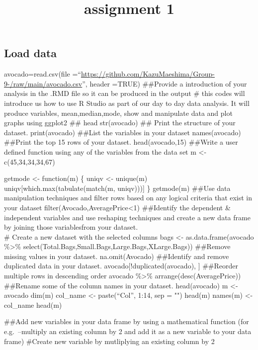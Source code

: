 \documentclass[
]{article}
\title{assignment 1}
\author{}
\date{\vspace{-2.5em}}
\begin{document}
\maketitle

\hypertarget{load-data}{%
\subsection{Load data}\label{load-data}}

avocado=read.csv(file
=``\url{https://github.com/KazuMaeshima/Group-9-/raw/main/avocado.csv}'',
header =TRUE) \#\#Provide a introduction of your analysis in the .RMD
file so it can be produced in the output \# this codes will introduce us
how to use R Studio as part of our day to day data analysis. It will
produce variables, mean,median,mode, show and manipulate data and plot
graphs using ggplot2 \#\# head str(avocado) \#\# Print the structure of
your dataset. print(avocado) \#\#List the variables in your dataset
names(avocado) \#\#Print the top 15 rows of your dataset.
head(avocado,15) \#\#Write a user defined function using any of the
variables from the data set m \textless- c(45,34,34,34,67)

getmode \textless- function(m) \{ uniqv \textless- unique(m)
uniqv{[}which.max(tabulate(match(m, uniqv))){]} \} getmode(m) \#\#Use
data manipulation techniques and filter rows based on any logical
criteria that exist in your dataset
filter(Avocado,AveragePrice\textless1) \#\#Identify the dependent \&
independent variables and use reshaping techniques and create a new data
frame by joining those variablesfrom your dataset.\\
\# Create a new dataset with the selected columns bags \textless-
as.data.frame(avocado \%\textgreater\%
select(Total.Bags,Small.Bags,Large.Bags,XLarge.Bags)) \#\#Remove missing
values in your dataset. na.omit(Avocado) \#\#Identify and remove
duplicated data in your dataset. avocado{[}!duplicated(avocado), {]}
\#\#Reorder multiple rows in descending order avocado \%\textgreater\%
arrange(desc(AveragePrice)) \#\#Rename some of the column names in your
dataset. head(avocado) m \textless- avocado dim(m) col\_name \textless-
paste(``Col'', 1:14, sep = "") head(m) names(m) \textless-col\_name
head(m)

\#\#Add new variables in your data frame by using a mathematical
function (for e.g.~--multiply an existing column by 2 and add it as a
new variable to your data frame) \#Create new variable by mutliplying an
existing column by 2
\end{document}
